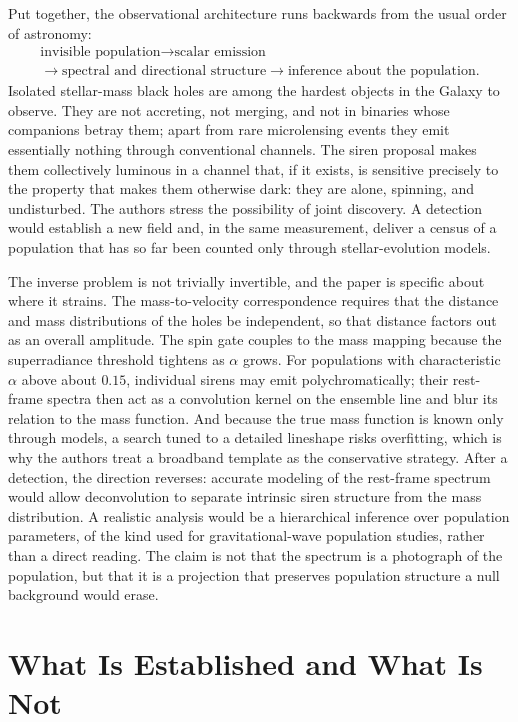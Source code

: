 \documentclass[11pt]{article}
\begin{document}
Put together, the observational architecture runs backwards from the usual order of astronomy:
\begin{gather*}
\text{invisible population} \rightarrow \text{scalar emission}\\
\rightarrow \text{spectral and directional structure} \rightarrow \text{inference about the population}.
\end{gather*}
Isolated stellar-mass black holes are among the hardest objects in the Galaxy to observe. They are not accreting, not merging, and not in binaries whose companions betray them; apart from rare microlensing events they emit essentially nothing through conventional channels. The siren proposal makes them collectively luminous in a channel that, if it exists, is sensitive precisely to the property that makes them otherwise dark: they are alone, spinning, and undisturbed. The authors stress the possibility of joint discovery. A detection would establish a new field and, in the same measurement, deliver a census of a population that has so far been counted only through stellar-evolution models.

The inverse problem is not trivially invertible, and the paper is specific about where it strains. The mass-to-velocity correspondence requires that the distance and mass distributions of the holes be independent, so that distance factors out as an overall amplitude. The spin gate couples to the mass mapping because the superradiance threshold tightens as $\alpha$ grows. For populations with characteristic $\alpha$ above about $0.15$, individual sirens may emit polychromatically; their rest-frame spectra then act as a convolution kernel on the ensemble line and blur its relation to the mass function. And because the true mass function is known only through models, a search tuned to a detailed lineshape risks overfitting, which is why the authors treat a broadband template as the conservative strategy. After a detection, the direction reverses: accurate modeling of the rest-frame spectrum would allow deconvolution to separate intrinsic siren structure from the mass distribution. A realistic analysis would be a hierarchical inference over population parameters, of the kind used for gravitational-wave population studies, rather than a direct reading. The claim is not that the spectrum is a photograph of the population, but that it is a projection that preserves population structure a null background would erase.

\section{What Is Established and What Is Not}
\end{document}
